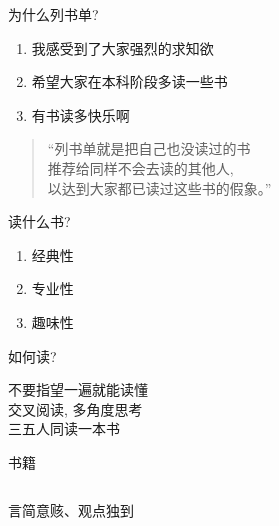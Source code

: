 \begin{frame}{为什么列书单?}
  \begin{enumerate}
    \setlength{\itemsep}{8pt}
    \item 我感受到了大家强烈的求知欲
    \item 希望大家在本科阶段多读一些书
    \item 有书读多快乐啊
  \end{enumerate}

  \vspace{0.80cm}
  \begin{quote}
    \centering
    ``列书单就是把自己也没读过的书\\[3pt]
    推荐给同样不会去读的其他人,\\[3pt]
    以达到大家都已读过这些书的假象。''
  \end{quote}
\end{frame}

\begin{frame}{读什么书?}
  \begin{enumerate}
    \setlength{\itemsep}{6pt}
    \centering
    \item 经典性
    \item 专业性
    \item 趣味性
  \end{enumerate}
\end{frame}

\begin{frame}{如何读?}
  \begin{center}
    不要指望一遍就能读懂\\[10pt]

    交叉阅读, 多角度思考\\[10pt]

    三五人同读一本书\\
  \end{center}
\end{frame}

\begin{frame}{}
  \centerline{\Large 书籍}
\end{frame}

\begin{frame}{}
  \begin{columns}
  \end{columns}

  \vspace{0.80cm}
  \centerline{言简意赅、观点独到}
\end{frame}

